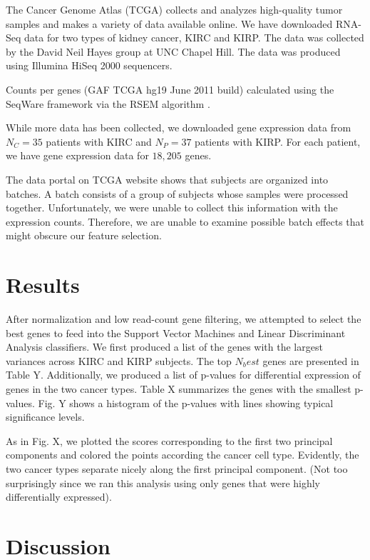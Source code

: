 The Cancer Genome Atlas (TCGA) collects and analyzes high-quality tumor samples
and makes a variety of data available online. We have downloaded RNA-Seq data
for two types of kidney cancer, KIRC and KIRP. The data was collected by the David
Neil Hayes group at UNC Chapel Hill. The data was produced using Illumina HiSeq
2000 sequencers. 

Counts per genes (GAF TCGA hg19 June 2011 build) calculated using the SeqWare
framework via the RSEM algorithm \cite{li2011rsem}.

While more data has been collected, we downloaded gene expression data from
$N_C =35$ patients with KIRC and $N_P = 37$ patients with KIRP.  For each
patient, we have gene expression data for $18,205$ genes. 

The data portal on TCGA website shows that subjects are organized into batches. A batch consists of
a group of subjects whose samples were processed together. Unfortunately,
we were unable to collect this information with the expression counts. Therefore, we are 
unable to examine possible batch effects that might obscure our feature selection. 

\section{Results}

After normalization and low read-count gene filtering, we attempted to select the best
genes to feed into the Support Vector Machines and Linear Discriminant Analysis classifiers.
We first produced a list of the genes with the largest variances across KIRC and KIRP subjects.
The top $N_best$ genes are presented in Table Y. Additionally, we produced a list of p-values
 for differential expression of genes in the two cancer types. Table X summarizes the genes with 
 the smallest p-values. Fig. Y shows a histogram of the p-values with lines showing typical 
 significance levels. 
 
As in Fig. X, we plotted the scores corresponding to the first two principal
components and colored the points according the cancer cell type. 
Evidently, the two cancer types separate nicely along the first
principal component. (Not too surprisingly since we ran this analysis using
only genes that were highly differentially expressed).  


\section{Discussion}

